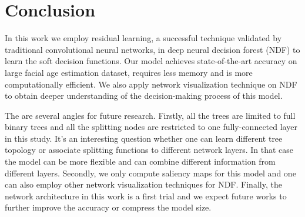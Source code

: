 \documentclass{bmvc2k}
\begin{document}
\section{Conclusion}
In this work we employ residual learning, a successful technique validated by traditional convolutional neural networks, in deep neural decision forest (NDF) to learn the soft decision functions. Our model achieves state-of-the-art accuracy on large facial age estimation dataset, requires less memory and is more computationally efficient. We also apply network visualization technique on NDF to obtain deeper understanding of the decision-making process of this model.  

The are several angles for future research. Firstly, all the trees are limited to full binary trees and all the splitting nodes are restricted to one fully-connected layer in this study. It's an interesting question whether one can learn different tree topology or associate splitting functions to different network layers. In that case the model can be more flexible and can combine different information from different layers. Secondly, we only compute saliency maps for this model and one can also employ other network visualization techniques for NDF. Finally, the network architecture in this work is a first trial and we expect future works to further improve the accuracy or compress the model size.




\end{document}
